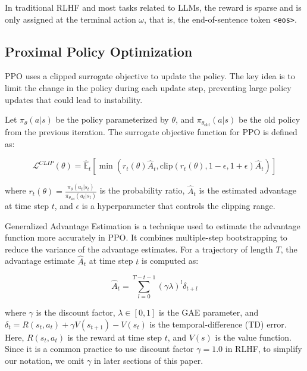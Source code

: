 In traditional RLHF and most tasks related to LLMs, the reward is sparse and is only assigned at the terminal action $\omega$, that is, the end-of-sentence token \texttt{<eos>}. 

\subsection{Proximal Policy Optimization}
PPO \citep{ppo} uses a clipped surrogate objective to update the policy. The key idea is to limit the change in the policy during each update step, preventing large policy updates that could lead to instability.

Let $\pi_{\theta}(a|s)$ be the policy parameterized by $\theta$, and $\pi_{\theta_{\text{old}}}(a|s)$ be the old policy from the previous iteration. The surrogate objective function for PPO is defined as:

\begin{equation}
\mathcal{L}^{CLIP}(\theta)=\hat{\mathbb{E}}_t\left[\min\left(r_t(\theta)\hat{A}_t,\text{clip}(r_t(\theta), 1-\epsilon, 1+\epsilon)\hat{A}_t\right)\right]
\end{equation}

where $r_t(\theta)=\frac{\pi_{\theta}(a_t|s_t)}{\pi_{\theta_{\text{old}}}(a_t|s_t)}$ is the probability ratio, $\hat{A}_t$ is the estimated advantage at time step $t$, and $\epsilon$ is a hyperparameter that controls the clipping range.

Generalized Advantage Estimation \citep{schulman2015high} is a technique used to estimate the advantage function more accurately in PPO. It combines multiple-step bootstrapping to reduce the variance of the advantage estimates. For a trajectory of length $T$, the advantage estimate $\hat{A}_t$ at time step $t$ is computed as:

\begin{equation}
\hat{A}_t=\sum_{l = 0}^{T-t-1}(\gamma\lambda)^l\delta_{t + l}
\label{eq:gae_definition}
\end{equation}

where $\gamma$ is the discount factor, $\lambda\in[0, 1]$ is the GAE parameter, and $\delta_t=R(s_t, a_t)+\gamma V(s_{t + 1})-V(s_t)$ is the temporal-difference (TD) error. Here, $R(s_t, a_t)$ is the reward at time step $t$, and $V(s)$ is the value function. Since it is a common practice to use discount factor $\gamma = 1.0$ in RLHF, to simplify our notation, we omit $\gamma$ in later sections of this paper.
\iffalse
